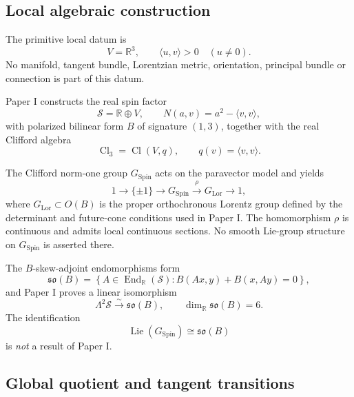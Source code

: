 \documentclass[11pt,a4paper]{article}
\theoremstyle{remark}
\newcommand{\R}{\mathbb{R}}
\newcommand{\Cl}{\operatorname{Cl}}
\newcommand{\SpinG}{G_{\mathrm{Spin}}}
\newcommand{\LorG}{G_{\mathrm{Lor}}}
\newcommand{\Smodel}{\mathcal S}
\newcommand{\soB}{\mathfrak{so}(B)}
\begin{document}
\subsection{Local algebraic construction}

The primitive local datum is
\begin{equation}
  V=\R^3,
  \qquad
  \langle u,v\rangle>0\quad(u\neq0).
\tag{2.1}
\end{equation}
No manifold, tangent bundle, Lorentzian metric, orientation, principal bundle or connection is part of this datum.

Paper I constructs the real spin factor
\begin{equation}
  \Smodel=\R\oplus V,
  \qquad
  N(a,v)=a^2-\langle v,v\rangle,
\tag{2.2}
\end{equation}
with polarized bilinear form \(B\) of signature \((1,3)\), together with the real Clifford algebra
\begin{equation}
  \Cl_3=\Cl(V,q),
  \qquad q(v)=\langle v,v\rangle.
\tag{2.3}
\end{equation}

The Clifford norm-one group \(\SpinG\) acts on the paravector model and yields
\begin{equation}
  1\longrightarrow\{\pm1\}
  \longrightarrow\SpinG
  \overset{\rho}{\longrightarrow}\LorG
  \longrightarrow1,
\tag{2.4}
\end{equation}
where \(\LorG\subset O(B)\) is the proper orthochronous Lorentz group defined by the determinant and future-cone conditions used in Paper I.  The homomorphism \(\rho\) is continuous and admits local continuous sections.  No smooth Lie-group structure on \(\SpinG\) is asserted there.

The \(B\)-skew-adjoint endomorphisms form
\begin{equation}
  \soB
  =\left\{
       A\in\operatorname{End}_{\R}(\Smodel):
       B(Ax,y)+B(x,Ay)=0
    \right\},
\tag{2.5}
\end{equation}
and Paper I proves a linear isomorphism
\begin{equation}
  \Lambda^2\Smodel\xrightarrow{\sim}\soB,
  \qquad
  \dim_{\R}\soB=6.
\tag{2.6}
\end{equation}
The identification
\begin{equation}
  \operatorname{Lie}(\SpinG)\cong\soB
\tag{2.7}
\end{equation}
is \emph{not} a result of Paper I.

\subsection{Global quotient and tangent transitions}
\end{document}
